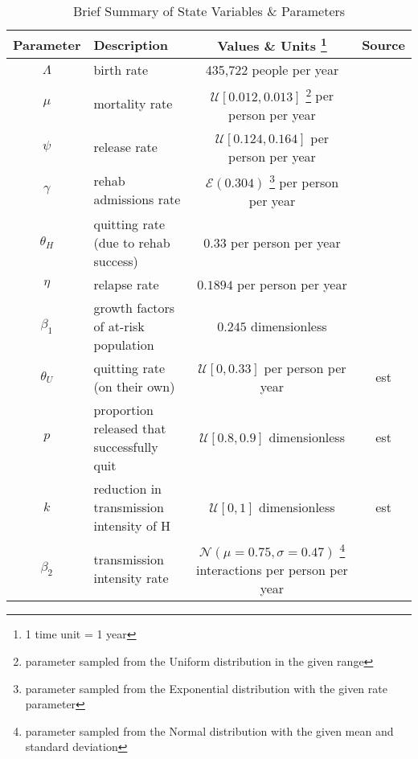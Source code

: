 \documentclass{amsart}
\begin{document}
\begin{minipage}{1.0\textwidth}
\begin{table}[H]
{\begin{tabular}{|c|l|c|c|}
			\textbf{Parameter} & \textbf{Description} & \textbf{Values \& Units \footnote{1 time unit = 1 year}} & \textbf{Source} \\
		  	\hline
			$\Lambda$ & birth rate & 435,722 people per year & \cite{CA_pop_birth_1983} \\ \hline
			$\mu$ & mortality rate & $\mathcal{U}[0.012, 0.013]$ \footnote{parameter sampled from the Uniform distribution in the given range\label{uniform_sample}} per person per year & \cite{CA_avg_life_1981} \\ \hline
	
			
			$\psi$ & release rate & $\mathcal{U}[0.124, 0.164]$ \footref{uniform_sample} per person per year &  \cite{CA_prison_parole} \\ \hline
			$\gamma$ & rehab admissions rate & $\mathcal{E}(0.304)$ \footnote{parameter sampled from the Exponential distribution with the given rate parameter} per person per year  &  \cite{gruenewald2010assessing} \\ \hline
 			$\theta_H$ & quitting rate (due to rehab success) & $0.33$ per person per year &  \cite{CA_FactSheetMeth} \\ \hline
 			$\eta$ & relapse rate & $0.1894$ per person per year &  \cite{brecht2000predictors} \\ \hline
 			$\beta_1$ & growth factors of at-risk population & $0.245$ dimensionless &  \cite{gruenewald2013mapping} \\ \hline
 			$\theta_U$ & quitting rate (on their own) & $\mathcal{U}[0, 0.33]$ \footref{uniform_sample} per person per year &  est \\ \hline
 			$p$ & proportion released that successfully quit & $\mathcal{U}[0.8, 0.9]$ \footref{uniform_sample} dimensionless &  est \\ \hline
 			$k$ & reduction in transmission intensity of H & $\mathcal{U}[0, 1]$ \footref{uniform_sample} dimensionless  & est \\ \hline
 			$\beta_2$ & transmission intensity rate & $\mathcal{N}(\mu=0.75, \sigma=0.47)$ \footnote{parameter sampled from the Normal distribution with the given mean and standard deviation} interactions per person per year & \cite{mubayi2011types} \\ \hline 			
		\end{tabular}
	
	} %

\caption{Brief Summary of State Variables \& Parameters}
\label{table:state_vars_params_brief}

\end{table}

\end{minipage}

\end{document}
